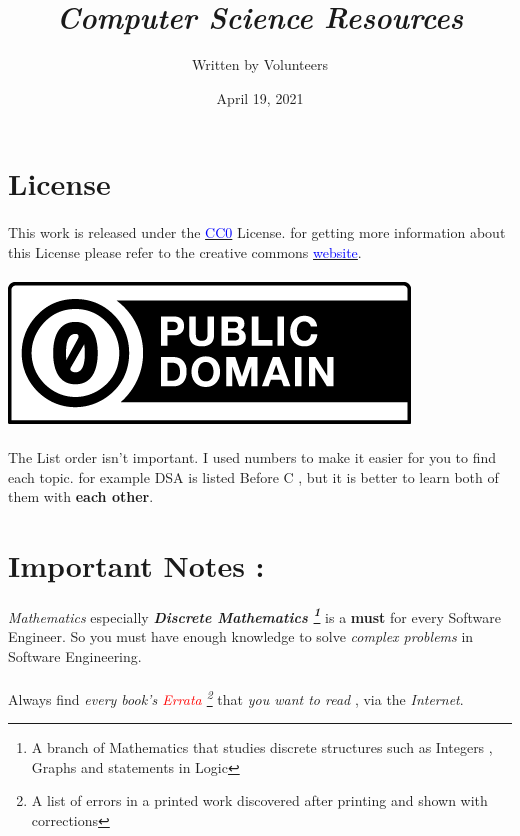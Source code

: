 \documentclass[12pt, a4paper]{article}
\title{\emph{Computer Science Resources }}
\author{Written by Volunteers}
\date{April 19, 2021}
\begin{document}
\maketitle
\section*{License}
\paragraph{}
This work is released under the \href{https://creativecommons.org/share-your-work/public-domain/}{\textcolor{blue}{CC0}} License. for getting more information about this License please refer to the creative commons \href{https://creativecommons.org}{\textcolor{blue}{website}}.\\
\\\includegraphics[scale=0.4]{cc-zero}

\paragraph{}
The List order isn't important. I used numbers to make it easier for you to find each topic. for example DSA is listed Before C , but it is better to learn both of them with \textbf{each other}.

\newpage
\section*{Important Notes :}
\paragraph{}
\emph{Mathematics} especially \emph{\textbf{Discrete Mathematics \footnote{ A branch of Mathematics that studies discrete structures such as Integers , Graphs and statements in Logic}}} is a \textbf{must} for every Software Engineer. So you must have enough knowledge to solve \emph{complex problems} in Software Engineering.

\paragraph{}
Always find \emph{every book's \textcolor{red}{Errata} \footnote{A list of errors in a printed work discovered after printing and shown with corrections}} that \emph{you want to read} , via the \emph{Internet}.
\end{document}
